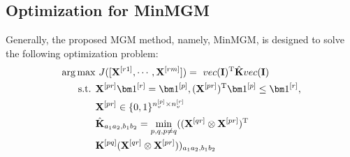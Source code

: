 
\subsection{Optimization for MinMGM}

Generally, the proposed MGM method, namely, MinMGM, is designed to solve the following optimization problem:
\begin{equation*}
    \begin{split}
        \arg\max & \ J([\mathbf X^{[r1]}, \cdots, \mathbf X^{[rm]}]) = \ vec(\mathbf I)^{\rm T} \hat{\mathbf K} vec(\mathbf I)\\
        \text{s.t. } & \mathbf X^{[pr]} \bm 1^{[r]} = \bm 1^{[p]}, (\mathbf X^{[pr]})^{\rm T}\bm 1^{[p]} \leq \bm 1^{[r]}, \\
        & \mathbf X^{[pr]} \in \{0, 1\}^{n^{[p]}_v\times n^{[r]}_v} \\
        & \hat{\mathbf K}_{a_1a_2,b_1b_2} = \min_{p, q, p \neq q} ((\mathbf X^{[qr]}\otimes \mathbf X^{[pr]})^{\rm T}\\
        &  \mathbf K^{[pq]} (\mathbf X^{[qr]}\otimes \mathbf X^{[pr]}))_{a_1a_2,b_1b_2}
    \end{split}
    \label{eq:minmgm_obj}
\end{equation*}

